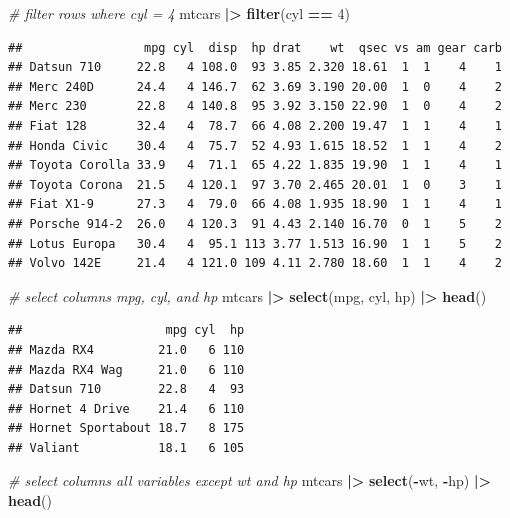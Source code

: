 \documentclass[
  12pt,
  oneside]{book}
\newenvironment{Shaded}{\begin{snugshade}}{\end{snugshade}}
\newcommand{\CommentTok}[1]{\textcolor[rgb]{0.56,0.35,0.01}{\textit{#1}}}
\newcommand{\DecValTok}[1]{\textcolor[rgb]{0.00,0.00,0.81}{#1}}
\newcommand{\FunctionTok}[1]{\textcolor[rgb]{0.13,0.29,0.53}{\textbf{#1}}}
\newcommand{\NormalTok}[1]{#1}
\newcommand{\SpecialCharTok}[1]{\textcolor[rgb]{0.81,0.36,0.00}{\textbf{#1}}}
\theoremstyle{definition}
\theoremstyle{definition}
\theoremstyle{definition}
\theoremstyle{definition}
\theoremstyle{remark}
\begin{document}
\begin{Shaded}
\begin{Highlighting}[]
\CommentTok{\# filter rows where cyl = 4}
\NormalTok{mtcars }\SpecialCharTok{|\textgreater{}} 
  \FunctionTok{filter}\NormalTok{(cyl }\SpecialCharTok{==} \DecValTok{4}\NormalTok{)}
\end{Highlighting}
\end{Shaded}

\begin{verbatim}
##                 mpg cyl  disp  hp drat    wt  qsec vs am gear carb
## Datsun 710     22.8   4 108.0  93 3.85 2.320 18.61  1  1    4    1
## Merc 240D      24.4   4 146.7  62 3.69 3.190 20.00  1  0    4    2
## Merc 230       22.8   4 140.8  95 3.92 3.150 22.90  1  0    4    2
## Fiat 128       32.4   4  78.7  66 4.08 2.200 19.47  1  1    4    1
## Honda Civic    30.4   4  75.7  52 4.93 1.615 18.52  1  1    4    2
## Toyota Corolla 33.9   4  71.1  65 4.22 1.835 19.90  1  1    4    1
## Toyota Corona  21.5   4 120.1  97 3.70 2.465 20.01  1  0    3    1
## Fiat X1-9      27.3   4  79.0  66 4.08 1.935 18.90  1  1    4    1
## Porsche 914-2  26.0   4 120.3  91 4.43 2.140 16.70  0  1    5    2
## Lotus Europa   30.4   4  95.1 113 3.77 1.513 16.90  1  1    5    2
## Volvo 142E     21.4   4 121.0 109 4.11 2.780 18.60  1  1    4    2
\end{verbatim}

\begin{Shaded}
\begin{Highlighting}[]
\CommentTok{\# select columns mpg, cyl, and hp}
\NormalTok{mtcars }\SpecialCharTok{|\textgreater{}} 
  \FunctionTok{select}\NormalTok{(mpg, cyl, hp) }\SpecialCharTok{|\textgreater{}} 
  \FunctionTok{head}\NormalTok{()}
\end{Highlighting}
\end{Shaded}

\begin{verbatim}
##                    mpg cyl  hp
## Mazda RX4         21.0   6 110
## Mazda RX4 Wag     21.0   6 110
## Datsun 710        22.8   4  93
## Hornet 4 Drive    21.4   6 110
## Hornet Sportabout 18.7   8 175
## Valiant           18.1   6 105
\end{verbatim}

\begin{Shaded}
\begin{Highlighting}[]
\CommentTok{\# select columns all variables except wt and hp}
\NormalTok{mtcars }\SpecialCharTok{|\textgreater{}} 
  \FunctionTok{select}\NormalTok{(}\SpecialCharTok{{-}}\NormalTok{wt, }\SpecialCharTok{{-}}\NormalTok{hp) }\SpecialCharTok{|\textgreater{}} 
  \FunctionTok{head}\NormalTok{()}
\end{Highlighting}
\end{Shaded}
\end{document}
